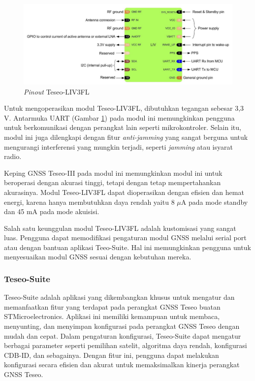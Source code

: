 \begin{figure}[H]
	\centering
	\includegraphics[width=13cm]{contents/chapter-2/teseo_pinout.png}
	\caption{\textit{Pinout} Teseo-LIV3FL \cite{STMicroelectronics2022}}
	\label{Fig: teseo_pinout}
\end{figure}

Untuk mengoperasikan modul Teseo-LIV3FL, dibutuhkan tegangan sebesar 3,3 V. Antarmuka UART (Gambar \ref{Fig: teseo_pinout}) pada modul ini memungkinkan pengguna untuk berkomunikasi dengan perangkat lain seperti mikrokontroler. Selain itu, modul ini juga dilengkapi dengan fitur \textit{anti-jamming} yang sangat berguna untuk mengurangi interferensi yang mungkin terjadi, seperti \textit{jamming} atau isyarat radio.

Keping GNSS Teseo-III pada modul ini memungkinkan modul ini untuk beroperasi dengan akurasi tinggi, tetapi dengan tetap mempertahankan akurasinya. Modul Teseo-LIV3FL dapat dioperasikan dengan efisien dan hemat energi, karena hanya membutuhkan daya rendah yaitu 8 $\mu$A pada mode standby dan 45 mA pada mode akuisisi.

Salah satu keunggulan modul Teseo-LIV3FL adalah kustomisasi yang sangat luas. Pengguna dapat memodifikasi pengaturan modul GNSS melalui serial port atau dengan bantuan aplikasi Teeo-Suite. Hal ini memungkinkan pengguna untuk menyesuaikan modul GNSS sesuai dengan kebutuhan mereka.

\subsubsection{Teseo-Suite}
Teseo-Suite adalah aplikasi yang dikembangkan khusus untuk mengatur dan memanfaatkan fitur yang terdapat pada perangkat GNSS Teseo buatan STMicroelectronics. Aplikasi ini memiliki kemampuan untuk membaca, menyunting, dan menyimpan konfigurasi pada perangkat GNSS Teseo dengan mudah dan cepat. Dalam pengaturan konfigurasi, Teseo-Suite dapat mengatur berbagai parameter seperti pemilihan satelit, algoritma daya rendah, konfigurasi CDB-ID, dan sebagainya. Dengan fitur ini, pengguna dapat melakukan konfigurasi secara efisien dan akurat untuk memaksimalkan kinerja perangkat GNSS Teseo.

